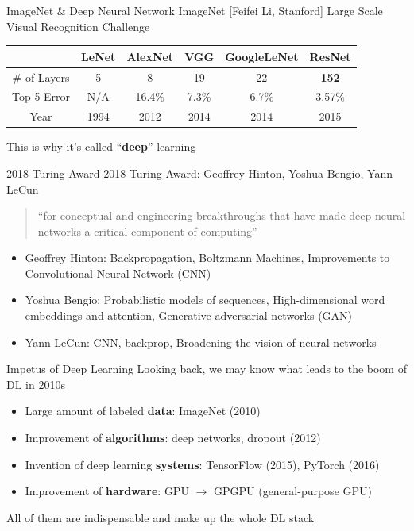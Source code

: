 \documentclass{../TexTemplate/myslide}
\begin{document}
\begin{frame}{ImageNet \& Deep Neural Network}
ImageNet [Feifei Li, Stanford] Large Scale Visual Recognition Challenge
\begin{center}
\begin{tabular}{cccccc}\hline\hline
 & LeNet & AlexNet & VGG & GoogleLeNet & ResNet\\\hline
\# of Layers & 5 & 8 & 19 & 22 & \textbf{152}\\\hline
Top 5 Error & N/A & 16.4\% & 7.3\% & 6.7\% & 3.57\%\\\hline
Year & 1994 & 2012 & 2014 & 2014 & 2015\\\hline
\end{tabular}
\end{center}
This is why it's called ``\textbf{deep}'' learning\\
\end{frame}

\begin{frame}{2018 Turing Award}
\href{https://awards.acm.org/about/2018-turing}{2018 Turing Award}: Geoffrey Hinton, Yoshua Bengio, Yann LeCun
\\\bigskip
\begin{quote}
``for conceptual and engineering breakthroughs that have made deep neural networks a critical component of computing''
\end{quote}
\begin{itemize}
	\item Geoffrey Hinton: Backpropagation, Boltzmann Machines, Improvements to Convolutional Neural Network (CNN)
	\item Yoshua Bengio: Probabilistic models of sequences, High-dimensional word embeddings and attention, Generative adversarial networks (GAN)
	\item Yann LeCun: CNN, backprop, Broadening the vision of neural networks
\end{itemize}
\end{frame}

\begin{frame}{Impetus of Deep Learning}
Looking back, we may know what leads to the boom of DL in 2010s
\begin{itemize}
	\item Large amount of labeled \textbf{data}: ImageNet (2010)
	\item Improvement of \textbf{algorithms}: deep networks, dropout (2012)
	\item Invention of deep learning \textbf{systems}: TensorFlow (2015), PyTorch (2016)
	\item Improvement of \textbf{hardware}: GPU $\to$ GPGPU (general-purpose GPU)
\end{itemize}
All of them are indispensable and make up the whole DL stack
\end{frame}
\end{document}
